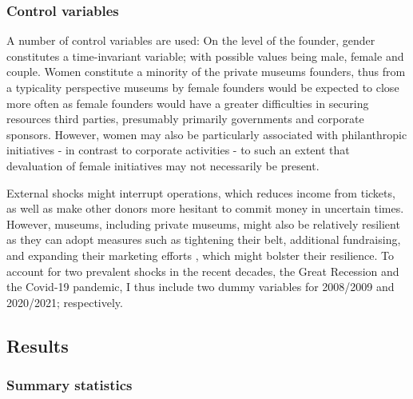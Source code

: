 \documentclass[12pt]{article}
\begin{document}
\subsubsection*{Control variables}


\bigbreak
\noindent
A number of control variables are used: 
On the level of the founder, gender constitutes a time-invariant variable; with possible values being male, female and couple.
Women constitute a minority of the private museums founders, thus from a typicality perspective \parencite{Rosch_1975_family} museums by female founders would be expected to close more often as female founders would have a greater difficulties in securing resources third parties, presumably primarily governments and corporate sponsors.
However, women may also be particularly associated with philanthropic initiatives - in contrast to corporate activities \parencite{Milam_2013_artgirls} - to such an extent that devaluation of female initiatives may not necessarily be present.

External shocks might interrupt operations, which reduces income from tickets, as well as make other donors more hesitant to commit money in uncertain times.
However, museums, including private museums, might also be relatively resilient as they can adopt measures such as tightening their belt, additional fundraising, and expanding their marketing efforts \parencite{Geller_Salamon_2010_resilience}, which might bolster their resilience.
To account for two prevalent shocks in the recent decades, the Great Recession and the Covid-19 pandemic, I thus include two dummy variables for 2008/2009 and 2020/2021; respectively.
\subsection*{Results}


\subsubsection*{Summary statistics}
\end{document}
